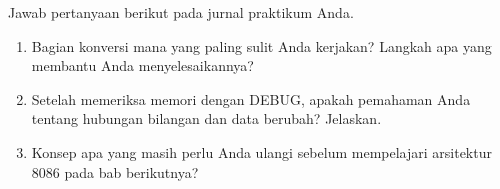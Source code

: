 \begin{refleksibox}
\vspace{1.1em}
Jawab pertanyaan berikut pada jurnal praktikum Anda.
\begin{enumerate}
    \item Bagian konversi mana yang paling sulit Anda kerjakan?
          Langkah apa yang membantu Anda menyelesaikannya?
    \item Setelah memeriksa memori dengan DEBUG, apakah pemahaman Anda
          tentang hubungan bilangan dan data berubah? Jelaskan.
    \item Konsep apa yang masih perlu Anda ulangi sebelum mempelajari
          arsitektur 8086 pada bab berikutnya?
\end{enumerate}
\end{refleksibox}
